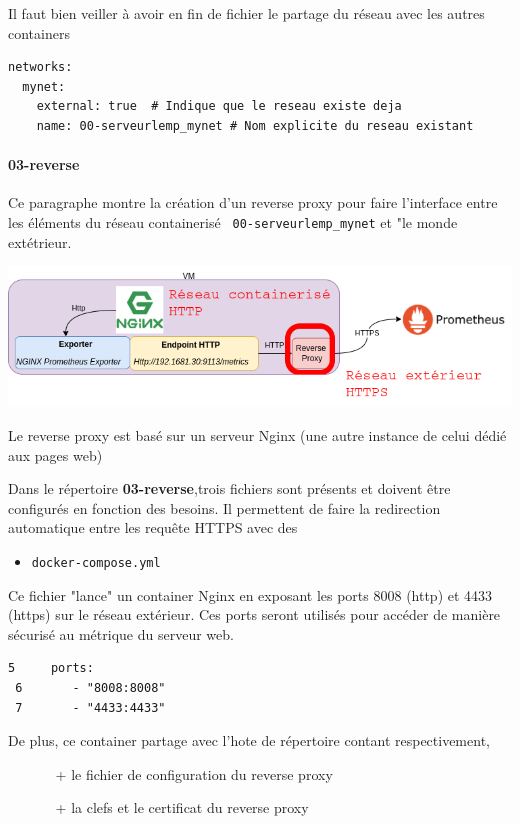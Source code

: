 \documentclass[french, 12pt]{article}%
\newcommand{\itemE}{\item[$\bullet$]}
\begin{document}
Il faut bien veiller à avoir en fin de fichier le partage du réseau avec les autres containers 

\begin{lstlisting}[style = commande]
networks:
  mynet:
    external: true  # Indique que le reseau existe deja
    name: 00-serveurlemp_mynet # Nom explicite du reseau existant
\end{lstlisting}

\paragraph{03-reverse}
Ce paragraphe montre la création d'un reverse proxy pour faire l'interface entre les éléments du réseau containerisé \verb? 00-serveurlemp_mynet? et "le monde extétrieur.
\begin{center}
\includegraphics[scale=0.5]{./ressource/etapeReverse.png}
\end{center}

Le reverse proxy est basé sur un serveur Nginx (une autre instance de celui dédié aux pages web)

Dans le répertoire \textbf{03-reverse},trois fichiers sont présents et doivent être configurés en fonction des besoins. Il permettent de faire la redirection automatique entre les requête HTTPS avec des 

\begin{itemize}
\itemE \verb?docker-compose.yml?
\end{itemize}
Ce fichier "lance" un container Nginx en exposant les ports 8008 (http) et 4433 (https) sur le réseau extérieur. Ces ports seront utilisés pour accéder de manière sécurisé au métrique du serveur web.


\begin{lstlisting}[style = commande]
 5     ports:
 6       - "8008:8008"
 7       - "4433:4433"
\end{lstlisting}

De plus, ce container partage avec l'hote de répertoire contant respectivement, 
\begin{itemize}
\item[ ] 
\begin{itemize}
\item[+] le fichier de configuration du reverse proxy 
\item[+] la clefs et le certificat du reverse proxy
\end{itemize}
\end{itemize}
\end{document}
